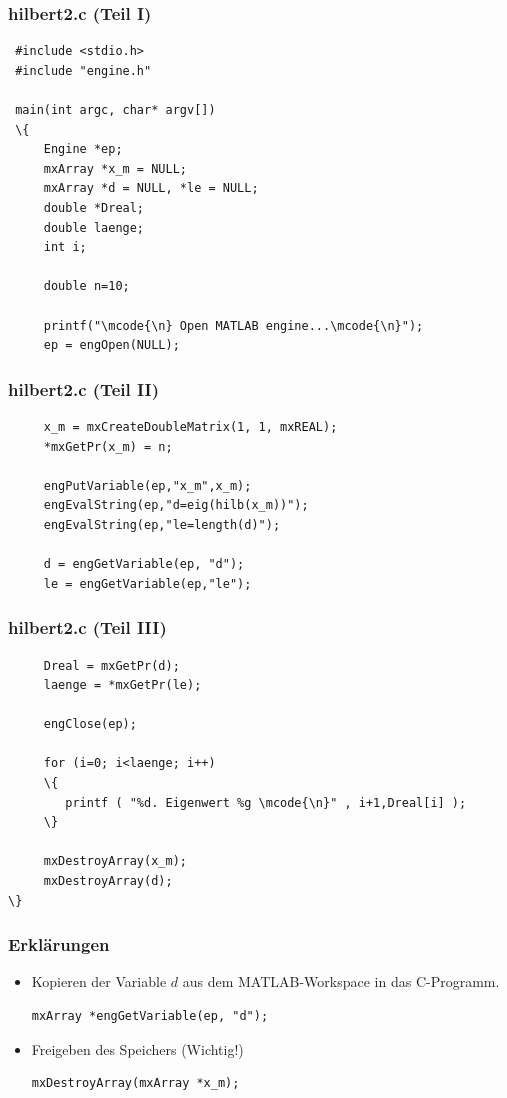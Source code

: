 %
%
\begin{frame}[fragile]\frametitle{hilbert2.c (Teil I)}
\begin{lstlisting}
 #include <stdio.h>
 #include "engine.h"
 
 main(int argc, char* argv[])
 \{
     Engine *ep;
     mxArray *x_m = NULL;
     mxArray *d = NULL, *le = NULL;
     double *Dreal;
     double laenge;
     int i;
     
     double n=10;
      
     printf("\mcode{\n} Open MATLAB engine...\mcode{\n}");
     ep = engOpen(NULL);
\end{lstlisting}
\end{frame}
%
%
\begin{frame}[fragile]\frametitle{hilbert2.c (Teil II)}
\begin{lstlisting}
     x_m = mxCreateDoubleMatrix(1, 1, mxREAL);
     *mxGetPr(x_m) = n;
     
     engPutVariable(ep,"x_m",x_m);
     engEvalString(ep,"d=eig(hilb(x_m))");
     engEvalString(ep,"le=length(d)");
     
     d = engGetVariable(ep, "d");
     le = engGetVariable(ep,"le");
\end{lstlisting}
\end{frame}
%
%
\begin{frame}[fragile]\frametitle{hilbert2.c (Teil III)}
\begin{lstlisting}     
     Dreal = mxGetPr(d);
     laenge = *mxGetPr(le);
    
     engClose(ep);
     
     for (i=0; i<laenge; i++)
     \{
        printf ( "%d. Eigenwert %g \mcode{\n}" , i+1,Dreal[i] );
     \}
     
     mxDestroyArray(x_m);
     mxDestroyArray(d);
\}    
\end{lstlisting}
\end{frame}
%
% 
\begin{frame}[fragile]\frametitle{Erkl\"arungen}
\begin{itemize}
\item Kopieren der Variable $d$ aus dem MATLAB-Workspace in das C-Programm.
\begin{lstlisting}
mxArray *engGetVariable(ep, "d");
\end{lstlisting}
\item Freigeben des Speichers (Wichtig!)
\begin{lstlisting}
mxDestroyArray(mxArray *x_m);
\end{lstlisting}
\end{itemize}
\end{frame}
